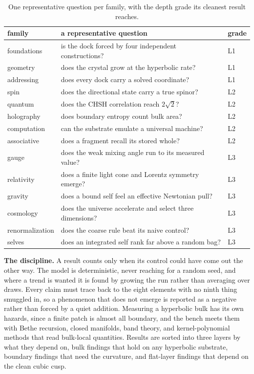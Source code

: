 \begin{table}[ht]
\centering
\small
\begin{tabular}{@{}lll@{}}
\toprule
family & a representative question & grade \\
\midrule
foundations & is the dock forced by four independent constructions? & L1 \\
geometry & does the crystal grow at the hyperbolic rate? & L1 \\
addressing & does every dock carry a solved coordinate? & L1 \\
spin & does the directional state carry a true spinor? & L2 \\
quantum & does the CHSH correlation reach $2\sqrt 2$? & L2 \\
holography & does boundary entropy count bulk area? & L2 \\
computation & can the substrate emulate a universal machine? & L2 \\
associative & does a fragment recall its stored whole? & L2 \\
gauge & does the weak mixing angle run to its measured value? & L3 \\
relativity & does a finite light cone and Lorentz symmetry emerge? & L3 \\
gravity & does a bound self feel an effective Newtonian pull? & L3 \\
cosmology & does the universe accelerate and select three dimensions? & L3 \\
renormalization & does the coarse rule beat its naive control? & L3 \\
selves & does an integrated self rank far above a random bag? & L3 \\
\bottomrule
\end{tabular}
\caption{One representative question per family, with the depth grade its cleanest result reaches.}
\label{tab:families}
\end{table}

\textbf{The discipline.} A result counts only when its control could have come out the other way. The model is deterministic, never reaching for a random seed, and where a trend is wanted it is found by growing the run rather than averaging over draws. Every claim must trace back to the eight elements with no ninth thing smuggled in, so a phenomenon that does not emerge is reported as a negative rather than forced by a quiet addition. Measuring a hyperbolic bulk has its own hazards, since a finite patch is almost all boundary, and the bench meets them with Bethe recursion, closed manifolds, band theory, and kernel-polynomial methods that read bulk-local quantities. Results are sorted into three layers by what they depend on, bulk findings that hold on any hyperbolic substrate, boundary findings that need the curvature, and flat-layer findings that depend on the clean cubic cusp.

